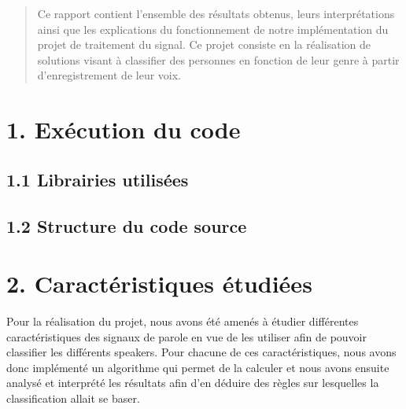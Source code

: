 \documentclass[a4paper,12pt]{report}	%
\begin{document}
\umonsCoverPage		%
	

\begin{abstract}
Ce rapport contient l'ensemble des résultats obtenus, leurs interprétations ainsi que les explications du fonctionnement de notre implémentation du projet de traitement du signal. Ce projet consiste en la réalisation de solutions visant à classifier des personnes en fonction de leur genre à partir d'enregistrement de leur voix.
\end{abstract}

\clearpage		
\tableofcontents

\clearpage		
{}

{\section*{1. Exécution du code}}
{\subsection*{1.1 Librairies utilisées}}
{\subsection*{1.2 Structure du code source}}

{\section*{2. Caractéristiques étudiées}}
Pour la réalisation du projet, nous avons été amenés à étudier différentes caractéristiques des signaux de parole en vue de les utiliser afin de pouvoir classifier les différents speakers. Pour chacune de ces caractéristiques, nous avons donc implémenté un algorithme qui permet de la calculer et nous avons ensuite analysé et interprété les résultats afin d'en déduire des règles sur lesquelles la classification allait se baser.
\end{document}

